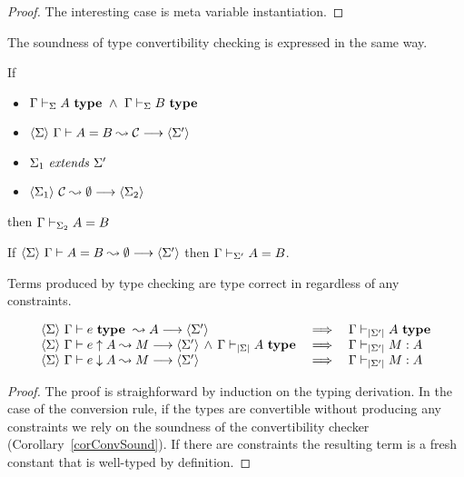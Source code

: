 \begin{proof}
    The interesting case is meta variable instantiation.
\end{proof}

The soundness of type convertibility checking is expressed in the same way.

\begin{lemma}
    If
    \begin{itemize}
	\item \( \Gamma\vdash_{\Sigma}A ~ \mathbf{type} ~ \wedge ~
		 \Gamma\vdash_{\Sigma}B ~ \mathbf{type}
	      \)
	\item $\langle {\Sigma} \rangle ~{{\Gamma} \vdash {A} = {B} \leadsto {\mathcal{C}}} \longrightarrow \langle {\Sigma'} \rangle$
	\item $ {\Sigma_1} ~ \mathit{extends} ~ {\Sigma'}$
	\item $\langle {\Sigma_1} \rangle ~{{\mathcal{C}} \leadsto {\emptyset}} \longrightarrow \langle {\Sigma_2} \rangle
	      $
    \end{itemize}
    then \( \Gamma\vdash_{\Sigma_2}A=B \)
\end{lemma}

\begin{corollary} \label{corConvSound}
    If $\langle {\Sigma} \rangle ~{{\Gamma} \vdash {A} = {B} \leadsto {\emptyset}} \longrightarrow \langle {\Sigma'} \rangle$ then
    $\Gamma\vdash_{\Sigma'}A=B$.
\end{corollary}

\begin{theorem} \label{thmTypeSafety}
    Terms produced by type checking are type correct in {\Core} regardless of any
    constraints.

    \[\begin{array}{lcl}
	{ \langle {\Sigma} \rangle ~{{\Gamma} \vdash {e} ~ \mathbf{type} ~ \leadsto {A}} \longrightarrow \langle {\Sigma'} \rangle }
	& \implies & {\Gamma\vdash_{\left|{\Sigma'}\right|}A ~ \mathbf{type}} \\
	{\langle {\Sigma} \rangle ~{{\Gamma} \vdash {e} \uparrow {A} \leadsto {M}} \longrightarrow \langle {\Sigma'} \rangle}
	\, \wedge \, {\Gamma\vdash_{\left|{\Sigma}\right|}A ~ \mathbf{type}}
	& \implies & \Gamma\vdash_{\left|{\Sigma'}\right|}M:A \\
	{\langle {\Sigma} \rangle ~{{\Gamma} \vdash {e} \downarrow {A} \leadsto {M}} \longrightarrow \langle {\Sigma'} \rangle}
	& \implies & \Gamma\vdash_{\left|{\Sigma'}\right|}M:A
    \end{array}\]
\end{theorem}

\begin{proof}
    The proof is straighforward by induction on the typing derivation. In the
    case of the conversion rule, if the types are convertible without producing
    any constraints we rely on the soundness of the convertibility checker
    (Corollary~\ref{corConvSound}). If there are constraints the resulting term
    is a fresh constant that is well-typed by definition.
\end{proof}

